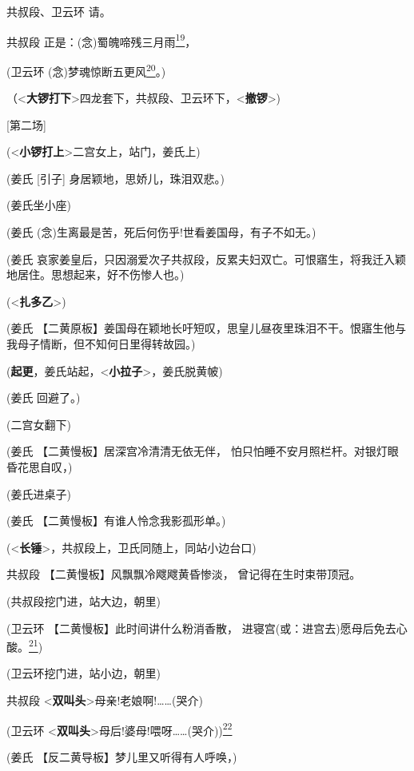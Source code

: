 共叔段、卫云环 请。

共叔段
正是：(念)蜀魄啼残三月雨\protect\hyperlink{fn19}{\textsuperscript{19}}，

(卫云环
(念)梦魂惊断五更风\protect\hyperlink{fn20}{\textsuperscript{20}}。)

（\textless{}\textbf{大锣打下}\textgreater{}四龙套下，共叔段、卫云环下，\textless{}\textbf{撤锣}\textgreater{})

{[}第二场{]}

(\textless{}\textbf{小锣打上}\textgreater{}二宫女上，站门，姜氏上)

(姜氏 {[}引子{]} 身居颖地，思娇儿，珠泪双悲。)

(姜氏坐小座)

(姜氏 (念)生离最是苦，死后何伤乎!世看姜国母，有子不如无。)

(姜氏
哀家姜皇后，只因溺爱次子共叔段，反累夫妇双亡。可恨寤生，将我迁入颖地居住。思想起来，好不伤惨人也。)

(\textless{}\textbf{扎多乙}\textgreater{})

(姜氏
【二黄原板】姜国母在颖地长吁短叹，思皇儿昼夜里珠泪不干。恨寤生他与我母子情断，但不知何日里得转故园。)

(\textbf{起更}，姜氏站起，\textless{}\textbf{小拉子}\textgreater{}，姜氏脱黄帔)

(姜氏 回避了。)

(二宫女翻下)

(姜氏 【二黄慢板】居深宫冷清清无依无伴，
怕只怕睡不安月照栏杆。对银灯眼昏花思自叹，)

(姜氏进桌子)

(姜氏 【二黄慢板】有谁人怜念我影孤形单。)

(\textless{}\textbf{长锤}\textgreater{}，共叔段上，卫氏同随上，同站小边台口)

共叔段 【二黄慢板】风飘飘冷飕飕黄昏惨淡， 曾记得在生时束带顶冠。

(共叔段挖门进，站大边，朝里)

(卫云环 【二黄慢板】此时间讲什么粉消香散，
进寝宫(或：进宫去)愿母后免去心酸。\protect\hyperlink{fn21}{\textsuperscript{21}})

(卫云环挖门进，站小边，朝里)

共叔段
\textless{}\textbf{双叫头}\textgreater{}母亲!老娘啊!\ldots{}\ldots{}(哭介)

(卫云环
\textless{}\textbf{双叫头}\textgreater{}母后!婆母!喂呀\ldots{}\ldots{}(哭介))\protect\hyperlink{fn22}{\textsuperscript{22}}

(姜氏 【反二黄导板】梦儿里又听得有人呼唤，)

